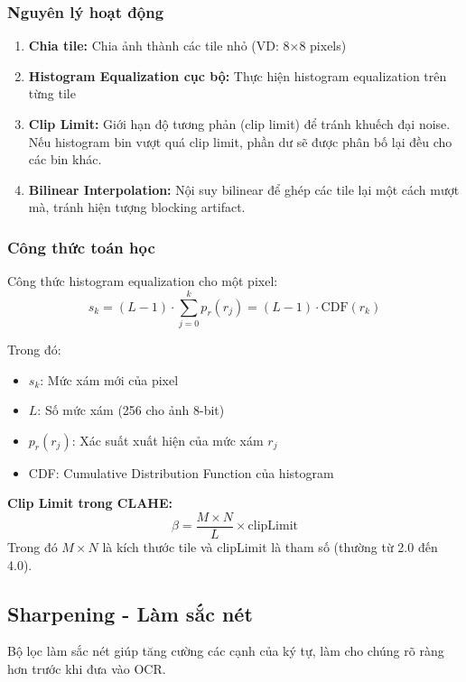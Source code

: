 \subsubsection{Nguyên lý hoạt động}
\begin{enumerate}
    \item \textbf{Chia tile:} Chia ảnh thành các tile nhỏ (VD: 8×8 pixels)
    \item \textbf{Histogram Equalization cục bộ:} Thực hiện histogram equalization trên từng tile
    \item \textbf{Clip Limit:} Giới hạn độ tương phản (clip limit) để tránh khuếch đại noise. Nếu histogram bin vượt quá clip limit, phần dư sẽ được phân bố lại đều cho các bin khác.
    \item \textbf{Bilinear Interpolation:} Nội suy bilinear để ghép các tile lại một cách mượt mà, tránh hiện tượng blocking artifact.
\end{enumerate}

\subsubsection{Công thức toán học}
Công thức histogram equalization cho một pixel:
\begin{equation}
    s_k = (L-1) \cdot \sum_{j=0}^{k} p_r(r_j) = (L-1) \cdot \text{CDF}(r_k)
\end{equation}

Trong đó:
\begin{itemize}
    \item $s_k$: Mức xám mới của pixel
    \item $L$: Số mức xám (256 cho ảnh 8-bit)
    \item $p_r(r_j)$: Xác suất xuất hiện của mức xám $r_j$
    \item CDF: Cumulative Distribution Function của histogram
\end{itemize}

\textbf{Clip Limit trong CLAHE:}
\begin{equation}
    \beta = \frac{M \times N}{L} \times \text{clipLimit}
\end{equation}
Trong đó $M \times N$ là kích thước tile và clipLimit là tham số (thường từ 2.0 đến 4.0).

\subsection{Sharpening - Làm sắc nét}
Bộ lọc làm sắc nét giúp tăng cường các cạnh của ký tự, làm cho chúng rõ ràng hơn trước khi đưa vào OCR.

